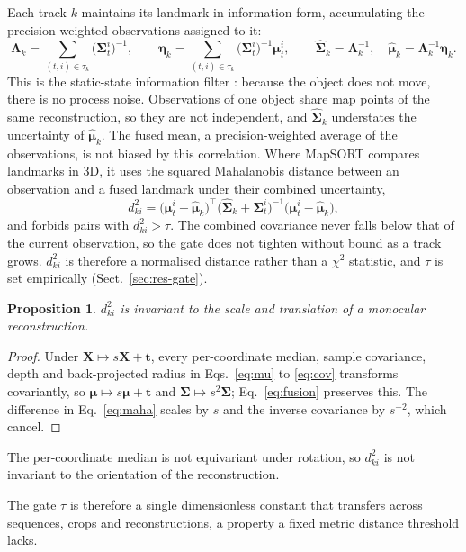 \documentclass[pdflatex,sn-basic]{sn-jnl}%
\theoremstyle{thmstyleone}%
\newtheorem{proposition}{Proposition}%
\newcommand{\bmu}{\bm{\mu}}
\newcommand{\bSig}{\bm{\Sigma}}
\newcommand{\bX}{\bm{X}}
\newcommand{\bLam}{\bm{\Lambda}}
\newcommand{\bEta}{\bm{\eta}}
\newcommand{\hmu}{\hat{\bmu}}
\newcommand{\hSig}{\hat{\bSig}}
\begin{document}
Each track $k$ maintains its landmark in information form, accumulating the precision-weighted observations assigned to it:
\begin{equation}
\bLam_k=\sum_{(t,i)\in\tau_k}\big(\bSig_t^i\big)^{-1},\qquad
\bEta_k=\sum_{(t,i)\in\tau_k}\big(\bSig_t^i\big)^{-1}\bmu_t^i,\qquad
\hSig_k=\bLam_k^{-1},\quad \hmu_k=\bLam_k^{-1}\bEta_k. \label{eq:fusion}
\end{equation}
This is the static-state information filter \citep{thrun2005probabilistic}: because the object does not move, there is no process noise. Observations of one object share map points of the same reconstruction, so they are not independent, and $\hSig_k$ understates the uncertainty of $\hmu_k$. The fused mean, a precision-weighted average of the observations, is not biased by this correlation. Where MapSORT compares landmarks in 3D, it uses the squared Mahalanobis distance between an observation and a fused landmark under their combined uncertainty,
\begin{equation}
d^2_{ki}=\big(\bmu_t^i-\hmu_k\big)^{\!\top}\big(\hSig_k+\bSig_t^i\big)^{-1}\big(\bmu_t^i-\hmu_k\big), \label{eq:maha}
\end{equation}
and forbids pairs with $d^2_{ki}>\tau$. The combined covariance never falls below that of the current observation, so the gate does not tighten without bound as a track grows. $d^2_{ki}$ is therefore a normalised distance rather than a $\chi^2$ statistic, and $\tau$ is set empirically (Sect.~\ref{sec:res-gate}).

\begin{proposition}\label{prop:scale}
$d^2_{ki}$ is invariant to the scale and translation of a monocular reconstruction.
\end{proposition}
\begin{proof}
Under $\bX\mapsto s\bX+\bm{t}$, every per-coordinate median, sample covariance, depth and back-projected radius in Eqs.~\eqref{eq:mu} to \eqref{eq:cov} transforms covariantly, so $\bmu\mapsto s\bmu+\bm{t}$ and $\bSig\mapsto s^2\bSig$; Eq.~\eqref{eq:fusion} preserves this. The difference in Eq.~\eqref{eq:maha} scales by $s$ and the inverse covariance by $s^{-2}$, which cancel.
\end{proof}
The per-coordinate median is not equivariant under rotation, so $d^2_{ki}$ is not invariant to the orientation of the reconstruction.

The gate $\tau$ is therefore a single dimensionless constant that transfers across sequences, crops and reconstructions, a property a fixed metric distance threshold lacks.
\end{document}
